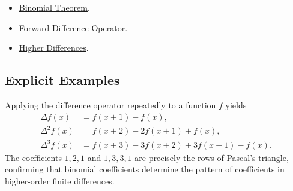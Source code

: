 \begin{dependencies}
\begin{itemize}
  \item \hyperref[thm:binomial-theorem]{Binomial Theorem}.
  \item \hyperref[def:forward-difference]{Forward Difference Operator}.
  \item \hyperref[def:higher-differences]{Higher Differences}.
\end{itemize}
\end{dependencies}

\subsection*{Explicit Examples}

\begin{remark*}[Interpretation]
Applying the difference operator repeatedly to a function \(f\) yields
\[
\begin{aligned}
\Delta f(x) &= f(x+1)-f(x), \\
\Delta^2 f(x) &= f(x+2)-2f(x+1)+f(x), \\
\Delta^3 f(x) &= f(x+3)-3f(x+2)+3f(x+1)-f(x).
\end{aligned}
\]
The coefficients \(1, 2, 1\) and \(1, 3, 3, 1\) are precisely the rows of
Pascal's triangle, confirming that binomial coefficients determine the pattern
of coefficients in higher-order finite differences.
\end{remark*}

